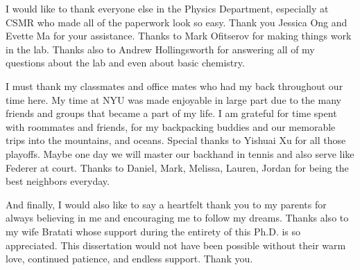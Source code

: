 I would like to thank everyone else in the Physics Department, especially at CSMR who made all of the paperwork look so easy. Thank you Jessica Ong and Evette Ma for your assistance. Thanks to Mark Ofitserov for making things work in the lab. Thanks also to Andrew Hollingsworth for answering all of my questions about the lab and even about basic chemistry.

I must thank my classmates and office mates who had my back throughout our time here. My time at NYU was made enjoyable in large part due to the many friends and groups that became a part of my life. I am grateful for time spent with roommates and friends, for my backpacking buddies and our memorable trips into the mountains, and oceans. Special thanks to Yishuai Xu for all those playoffs. Maybe one day we will master our backhand in tennis and also serve like Federer at court. Thanks to Daniel, Mark, Melissa, Lauren, Jordan for being the best neighbors everyday.

And finally, I would also like to say a heartfelt thank you to my parents for always believing in me and encouraging me to follow my dreams. Thanks also to my wife Bratati whose support during the entirety of this Ph.D. is so appreciated. This dissertation would not have been possible without their warm love, continued patience, and endless support. Thank you.

